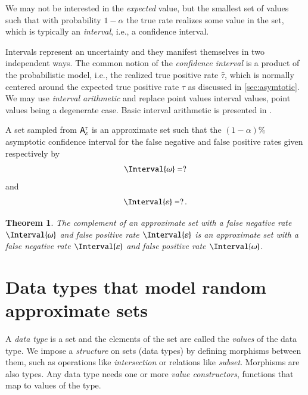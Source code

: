 \documentclass[10pt,final,hidelinks]{article}
\numberwithin{equation}{section}
\newcommand{\tprate}{\tau}
\newcommand{\fprate}{\varepsilon}
\newcommand{\fnrate}{\omega}
\newcommand{\tprateob}{\hat{\tprate}}
\newcommand{\envnumstyle}{chapter}
\renewcommand{\envnumstyle}{chapter}
\renewcommand{\envnumstyle}{section}
\theoremstyle{plain}
\newtheorem{theorem}{Theorem}[\envnumstyle]
\begin{document}
We may not be interested in the \emph{expected} value, but the smallest set of values such that with probability $1-\alpha$ the true rate 
realizes some value in the set, which is typically an \emph{interval}, i.e., a confidence interval.

Intervals represent an uncertainty and they manifest themselves in two independent ways.
The common notion of the \emph{confidence interval} is a product of the probabilistic model, i.e., the realized true positive rate $\tprateob$, which is normally centered around the expected true positive rate $\tprate$ as discussed in \cref{sec:asymtotic}.
We may use \emph{interval arithmetic} and replace point values interval values, point values being a degenerate case.
Basic interval arithmetic is presented in \cite{basicinterval}.

A set sampled from $\ASet{A}[\fprate][\tprate]$ is an approximate set such that the $(1-\alpha)\%$ asymptotic confidence interval for the false negative and 
false positive rates given respectively by
\begin{equation}
\label{eq:fnrate_union_set}
\Interval{\fnrate} = ?
\end{equation}
and
\begin{equation}
\label{eq:fprate_union_set}
\Interval{\fprate} = ?\,.
\end{equation}


\begin{theorem}
\label{thm:uncertain_rates_comp_set}
The \emph{complement} of an approximate set with a false negative rate $\Interval{\fnrate}$ and false positive rate $\Interval{\fprate}$ is an approximate set with a false negative rate $\Interval{\fprate}$ and false positive rate $\Interval{\fnrate}$.
\end{theorem}
\newcommand{\ctor}[2]{\APFun{F}[#1][#2]}


\section{Data types that model random approximate sets}
\label{sec:adt}



A \emph{data type} is a set and the elements of the set are called the \emph{values} of the data type.
We impose a \emph{structure} on sets (data types) by defining morphisms between them, such as operations like \emph{intersection} or relations like \emph{subset}.
Morphisms are also types.
Any data type needs one or more \emph{value constructors}, functions that map to values of the type.
\end{document}
